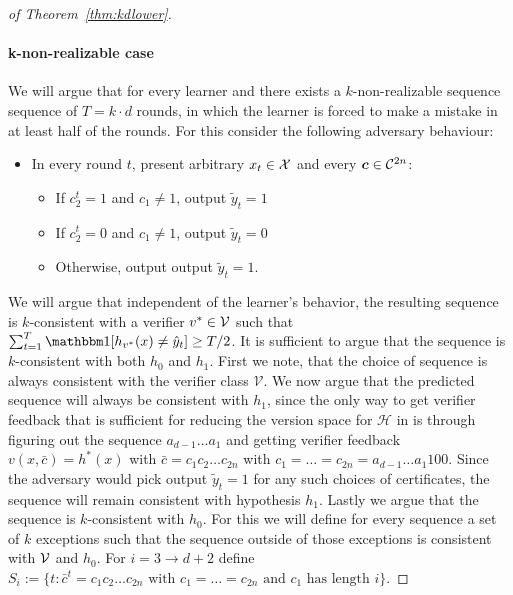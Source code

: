 \documentclass[anon]{alt2027} %
\begin{document}
\begin{proof}[of Theorem~\ref{thm:kdlower}]
\paragraph{k-non-realizable case} We will argue that for every learner and there exists a $k$-non-realizable sequence sequence of $T= k\cdot d$ rounds, in which the learner is forced to make a mistake in at least half of the rounds. 
For this consider the following adversary behaviour: 
\begin{itemize}
    \item In every round $t$, present arbitrary $x_t \in {\mathcal X}$ and every $\bm{c} \in {{\mathcal C}}^{2n}$: 
    \begin{itemize}
        \item If $c_2^t = 1$ and $c_1 \neq 1$, output $\tilde{y}_{t} = 1$
        \item If $c_2^t = 0$ and $c_1 \neq 1$, output $\tilde{y}_{t} = 0$
        \item Otherwise, output output $\tilde{y}_{t} = 1$.
    \end{itemize}
\end{itemize}
We will argue that independent of the learner's behavior, the resulting sequence is $k$-consistent with a verifier $v^* \in {\mathcal V}$ such that $\sum_{t=1}^T \indct[h_{v^*}(x) \neq \hat{y}_t] \geq T/2$. 
It is sufficient to argue that the sequence is $k$-consistent with both $h_0$ and $h_1$.
First we note, that the choice of sequence is always consistent with the verifier class $\mathcal{V}$.
We now argue that the predicted sequence will always be consistent with $h_1$, since the only way to get verifier feedback that is sufficient for reducing the version space for $\mathcal{H}$ in  is through figuring out the sequence $a_{d-1} \dots a_1$ and getting verifier feedback $v(x, \bar{c}) = h^* (x) $ with $\bar{c} = c_1c_2 \dots c_{2n}$ with $c_1 = \dots = c_{2n} = a_{d-1} \dots a_1 1 0 0$. Since the adversary would pick output $\tilde{y}_t =1$ for any such choices of certificates, the sequence will remain consistent with hypothesis $h_1$.
Lastly we argue that the sequence is $k$-consistent with $h_0$.
For this we will define for every sequence a set of $k$ exceptions such that the sequence outside of those exceptions is consistent with ${\mathcal V}$ and $h_0$.
For $i = 3 \to d+2$ define $S_i := \{t : \bar{c}^t = c_1c_2 \dots c_{2n} \text{ with } c_1 = \dots = c_{2n} \text{ and } c_1 \text{ has length }i\}$.


\end{proof}
\end{document}
